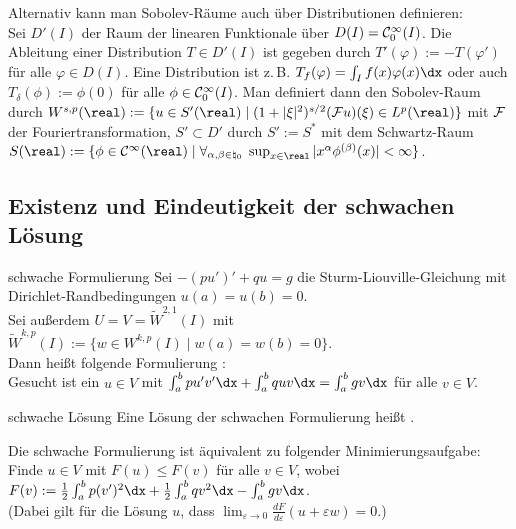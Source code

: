 \begin{Bem}
    Alternativ kann man Sobolev-Räume auch über Distributionen definieren:\\
    Sei $D'(I)$ der Raum der linearen Funktionale über $D(I) = \mathcal{C}_0^\infty(I)$.
    Die Ableitung einer Distribution $T \in D'(I)$ ist gegeben durch
    $T'(\varphi) := -T(\varphi')$ für alle $\varphi \in D(I)$.
    Eine Distribution ist z.\,B. $T_f(\varphi) = \int_I f(x)\varphi(x)\dx$
    oder auch $T_\delta(\phi) := \phi(0)$ für alle $\phi \in \mathcal{C}_0^\infty(I)$.
    Man definiert dann den Sobolev-Raum durch
    $W^{s,p}(\real) := \{u \in S'(\real) \;|\;
    (1 + |\xi|^2)^{s/2} (\F u)(\xi) \in L^p(\real)\}$
    mit $\mathcal{F}$ der Fouriertransformation, $S' \subset D'$ durch
    $S' := S^\ast$ mit dem Schwartz-Raum\\
    $S(\real) := \{\phi \in \C^\infty(\real) \;|\;
    \forall_{\alpha, \beta \in \natural_0}\;
    \sup_{x \in \real} |x^\alpha \phi^{(\beta)}(x)| < \infty\}$.
\end{Bem}

\pagebreak

\subsection{%
    Existenz und Eindeutigkeit der schwachen Lösung%
}


\begin{Def}{schwache Formulierung}
    Sei $-(pu')' + qu = g$ die Sturm-Liouville-Gleichung mit
    Dirichlet-Randbedingungen
    $u(a) = u(b) = 0$.\\
    Sei außerdem $U = V = \widetilde{W}^{2,1}(I)$ mit
    $\widetilde{W}^{k,p}(I) := \{w \in W^{k,p}(I) \;|\; w(a) = w(b) = 0\}$.\\
    Dann heißt folgende Formulierung :\\
    Gesucht ist ein $u \in V$ mit
    $\int_a^b pu'v'\dx + \int_a^b quv\dx = \int_a^b gv\dx$ für alle $v \in V$.
\end{Def}

\begin{Def}{schwache Lösung}
    Eine Lösung der schwachen Formulierung heißt .
\end{Def}

\begin{Bem}
    Die schwache Formulierung ist äquivalent zu folgender Minimierungsaufgabe:
    Finde $u \in V$ mit $F(u) \le F(v)$ für alle $v \in V$, wobei
    $F(v) := \frac{1}{2} \int_a^b p(v')^2 \dx + \frac{1}{2} \int_a^b q v^2 \dx -
    \int_a^b g v \dx$.\\
    (Dabei gilt für die Lösung $u$, dass
    $\lim_{\varepsilon \to 0} \frac{dF}{d\varepsilon}(u + \varepsilon w) = 0$.)
\end{Bem}


